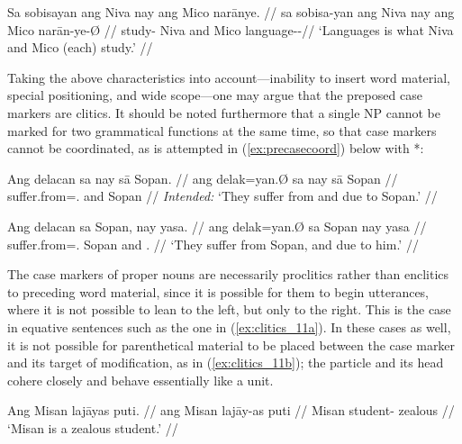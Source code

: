 \a\label{ex:clitics_7d}\begingl
	\gla Sa sobisayan ang Niva nay ang Mico narānye. //
	\glb sa sobisa-yan ang Niva nay ang Mico narān-ye-Ø //
	\glc \PatT{} study-\TplM{} \Aarg{} Niva and \Aarg{} Mico 
		language-\Pl{}-\Top{}//
	\glft `Languages is what Niva and Mico (each) study.' //
\endgl
\xe


Taking the above characteristics into account---inability to insert word
material, special positioning, and wide scope---one may argue that the preposed
case markers are clitics. It should be noted furthermore that a single NP
cannot be marked for two grammatical functions at the same time, so that case
markers cannot be coordinated, as is attempted in (\ref{ex:precasecoord}) below
with *:

\pex
\a\label{ex:precasecoord}\ljudge*\begingl
	\gla Ang delacan sa nay sā Sopan. //
	\glb ang delak=yan.Ø sa nay sā Sopan //
	\glc \AgtT{} suffer.from=\TplM{}.\Top{} \Parg{} and \Caus{} Sopan //
	\glft \textit{Intended:} `They suffer from and due to Sopan.' //
\endgl

\a\begingl
	\gla Ang delacan sa Sopan, nay yasa. //
	\glb ang delak=yan.Ø sa Sopan nay yasa //
	\glc \AgtT{} suffer.from=\TplM{}.\Top{} \Parg{} Sopan and \TsgM{}.\Caus{} //
	\glft `They suffer from Sopan, and due to him.' //
	\endgl
\xe

The case markers of proper nouns are necessarily proclitics rather than
enclitics to preceding word material, since it is possible for them to begin
utterances, where it is not possible to lean to the left, but only to the 
right. This is the case in equative sentences such as the one in 
(\ref{ex:clitics_11a}). In these cases as well, it is not possible for
parenthetical material to be placed between the case marker and its target of
modification, as in (\ref{ex:clitics_11b}); the particle and its head cohere
closely and behave essentially like a unit.

\pex\label{ex:clitics_11}
\a\label{ex:clitics_11a}\begingl
	\gla Ang Misan lajāyas puti. //
	\glb ang Misan lajāy-as puti //
	\glc \Aarg{} Misan student-\Parg{} zealous //
	\glft `Misan is a zealous student.' //
\endgl


